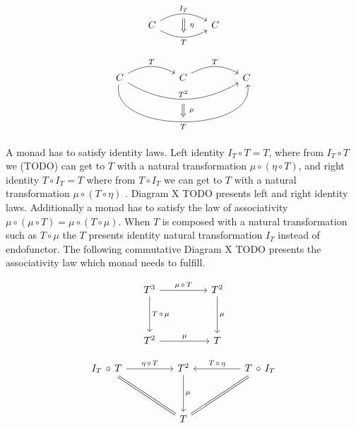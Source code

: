 \documentclass[article]{aaltoseries}
\begin{document}
    \[
      \begin{tikzcd}[column sep=huge]
        C \arrow[r, bend left, "I_T", ""{name=A, below}]
        \arrow[r, bend right, "T"{below}, ""{name=B}]
        & C
        \arrow[Rightarrow, from=A, to=B, "\eta"{right=4}]
      \end{tikzcd}
    \]

    \[
      \begin{tikzcd}[column sep=huge]
        C \arrow[r, bend left, "T"]
        \arrow[rr, bend right=30, "T^2", ""{name=A, below}]
        \arrow[rr, bend right=100, "T"{below}, ""{name=B}]
        & C
        \arrow[r, bend left, "T"]
        & C
        \arrow[Rightarrow, from=A, to=B, "\mu"{right=4}]
      \end{tikzcd}
    \]

    A monad has to satisfy identity laws. Left identity $I_T \circ T = T$, where from
    $I_T \circ T$ we (TODO) can get to $T$ with a natural transformation $\mu \circ (\eta \circ T)$, and right
    identity $T \circ I_T = T$ where from $T \circ I_T$ we can get to $T$ with a natural
    transformation $\mu \circ (T \circ \eta)$ \cite{mac2013categories, moggi1989computational}.
    Diagram X TODO presents left and right identity laws. Additionally a monad has to
    satisfy the law of associativity $\mu \circ (\mu \circ T) = \mu \circ (T \circ \mu)$. When $T$ is
    composed with a natural transformation such as $T \circ \mu$ the $T$ presents identity
    natural transformation $I_T$ instead of endofunctor. The following
    commutative Diagram X TODO presents the associativity law which monad needs to
    fulfill.

    \[
      \begin{tikzcd}[row sep=huge, column sep=huge]
        T^3 \arrow[r, "\mu\, \circ\, T"]
        \arrow[d, "T\, \circ\, \mu"]
        & T^2 \arrow[d, "\mu"] \\
        T^2 \arrow[r, "\mu"]
        & T
      \end{tikzcd}
    \]

    \[
      \begin{tikzcd}[row sep=huge, column sep=huge]
        I_T\, \circ\, T
        \arrow[r, "\eta\, \circ\, T"]
        \arrow[dr, equal]
        & T^2
        \arrow[d, "\mu"]
        & T\, \circ\, I_T
        \arrow[l, "T\, \circ\, \eta"{above}]
        \arrow[dl, equal] \\
        {}
        & T
        &
      \end{tikzcd}
    \]
\end{document}
